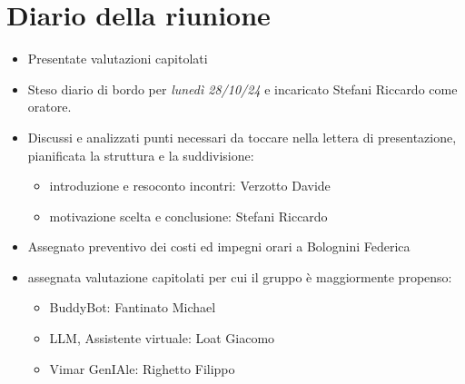 \section{Diario della riunione}

\begin{itemize}
    \item Presentate valutazioni capitolati
    \item Steso diario di bordo per \emph{lunedì 28/10/24} e incaricato Stefani Riccardo come oratore.
    \item Discussi e analizzati punti necessari da toccare nella lettera di presentazione, pianificata la struttura e la suddivisione:
    \begin{itemize}
        \renewcommand{\labelitemii}{--}
        \item introduzione e resoconto incontri: Verzotto Davide
        \item motivazione scelta e conclusione: Stefani Riccardo
    \end{itemize}
    \item Assegnato preventivo dei costi ed impegni orari a Bolognini Federica
    \item assegnata valutazione capitolati per cui il gruppo è maggiormente propenso:
    \begin{itemize}
        \renewcommand{\labelitemii}{--}
        \item BuddyBot: Fantinato Michael
        \item LLM, Assistente virtuale: Loat Giacomo
        \item Vimar GenIAle: Righetto Filippo
    \end{itemize}
\end{itemize}



